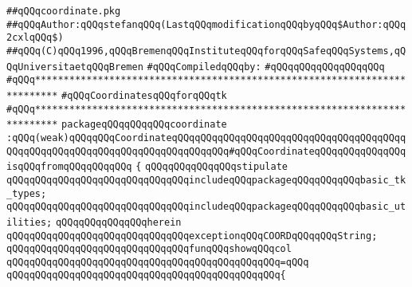 \label{src/lib/tk/src/coordinate.pkg}
\verb|##qQQqcoordinate.pkg|\newline
\verb|##qQQqAuthor:qQQqstefanqQQq(LastqQQqmodificationqQQqbyqQQq$Author:qQQq2cxlqQQq$)|\newline
\verb|##qQQq(C)qQQq1996,qQQqBremenqQQqInstituteqQQqforqQQqSafeqQQqSystems,qQQqUniversitaetqQQqBremen|\newline
\newline
\verb|#qQQqCompiledqQQqby:|\newline
\verb|#qQQqqQQqqQQqqQQqqQQq|\newline
\newline
\newline
\verb|#qQQq**************************************************************************|\newline
\verb|#qQQqCoordinatesqQQqforqQQqtk|\newline
\verb|#qQQq**************************************************************************|\newline
\newline
\newline
\verb|packageqQQqqQQqqQQqcoordinate|\newline
\verb|:qQQq(weak)qQQqqQQqCoordinateqQQqqQQqqQQqqQQqqQQqqQQqqQQqqQQqqQQqqQQqqQQqqQQqqQQqqQQqqQQqqQQqqQQqqQQqqQQqqQQq#qQQqCoordinateqQQqqQQqqQQqqQQqisqQQqfromqQQqqQQqqQQq|\newline
\verb|{|\newline
\verb|qQQqqQQqqQQqqQQqstipulate|\newline
\newline
\verb|qQQqqQQqqQQqqQQqqQQqqQQqqQQqqQQqincludeqQQqpackageqQQqqQQqqQQqbasic_tk_types;|\newline
\verb|qQQqqQQqqQQqqQQqqQQqqQQqqQQqqQQqincludeqQQqpackageqQQqqQQqqQQqbasic_utilities;|\newline
\verb|qQQqqQQqqQQqqQQqherein|\newline
\newline
\verb|qQQqqQQqqQQqqQQqqQQqqQQqqQQqqQQqexceptionqQQqCOORDqQQqqQQqString;|\newline
\newline
\verb|qQQqqQQqqQQqqQQqqQQqqQQqqQQqqQQqfunqQQqshowqQQqcol|\newline
\verb|qQQqqQQqqQQqqQQqqQQqqQQqqQQqqQQqqQQqqQQqqQQqqQQq=qQQq|\newline
\verb|qQQqqQQqqQQqqQQqqQQqqQQqqQQqqQQqqQQqqQQqqQQqqQQq{|\newline
